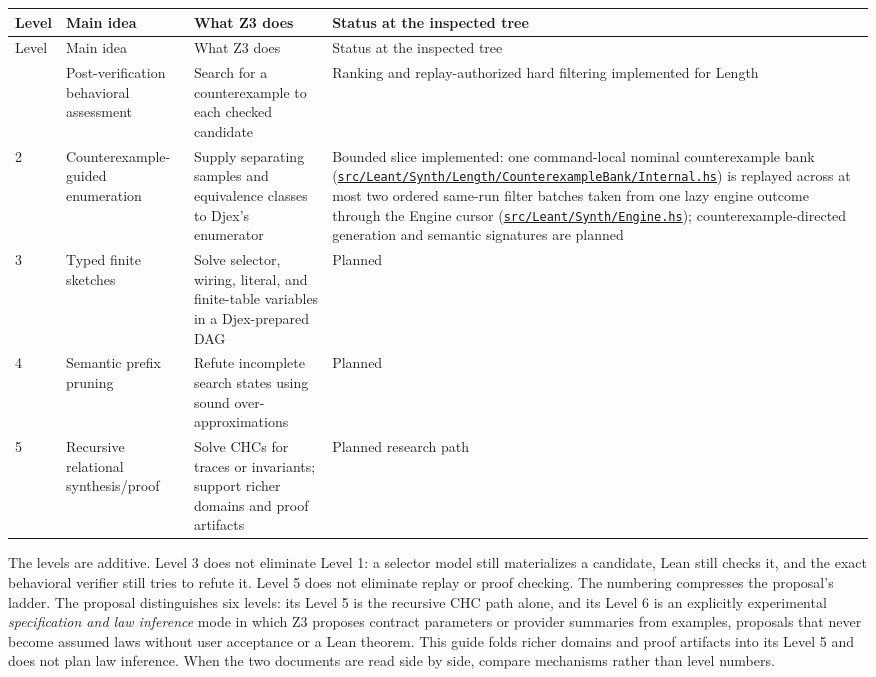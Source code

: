 \documentclass[10pt,letterpaper,oneside]{report}
\def\LeantCommit{494259dbd85ae2e6749246b08377f44b2f9936ac}
\def\LeantBase{https://github.com/VladimirReshetnikov/Leant/blob/\LeantCommit/}
\newcommand{\lpath}[1]{\href{\LeantBase#1}{\nolinkurl{#1}}}
\begin{document}
\begin{longtable}{@{}L{0.10\textwidth}L{0.28\textwidth}L{0.26\textwidth}L{0.28\textwidth}@{}}
\toprule
Level & Main idea & What Z3 does & Status at the inspected tree \\
\midrule
\endfirsthead
\toprule
Level & Main idea & What Z3 does & Status at the inspected tree \\
\midrule
\endhead
\bottomrule
{} & Post-verification behavioral assessment & Search for a counterexample to each checked candidate & Ranking and replay-authorized hard filtering implemented for Length \\
2 & Counterexample-guided enumeration & Supply separating samples and equivalence classes to Djex's enumerator & Bounded slice implemented: one command-local nominal counterexample bank (\lpath{src/Leant/Synth/Length/CounterexampleBank/Internal.hs}) is replayed across at most two ordered same-run filter batches taken from one lazy engine outcome through the Engine cursor (\lpath{src/Leant/Synth/Engine.hs}); counterexample-directed generation and semantic signatures are planned \\
3 & Typed finite sketches & Solve selector, wiring, literal, and finite-table variables in a Djex-prepared DAG & Planned \\
4 & Semantic prefix pruning & Refute incomplete search states using sound over-approximations & Planned \\
5 & Recursive relational synthesis/proof & Solve CHCs for traces or invariants; support richer domains and proof artifacts & Planned research path \\
\end{longtable}

The levels are additive. Level 3 does not eliminate Level 1: a selector model still materializes a candidate, Lean still checks it, and the exact behavioral verifier still tries to refute it. Level 5 does not eliminate replay or proof checking.
The numbering compresses the proposal's ladder. The proposal \cite{proposal} distinguishes six levels: its Level 5 is the recursive CHC path alone, and its Level 6 is an explicitly experimental \emph{specification and law inference} mode in which Z3 proposes contract parameters or provider summaries from examples, proposals that never become assumed laws without user acceptance or a Lean theorem. This guide folds richer domains and proof artifacts into its Level 5 and does not plan law inference. When the two documents are read side by side, compare mechanisms rather than level numbers.
\end{document}
